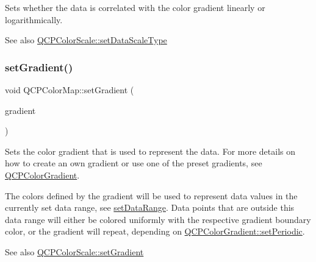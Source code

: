 Sets whether the data is correlated with the color gradient linearly or logarithmically.

\begin{DoxySeeAlso}{See also}
\hyperlink{class_q_c_p_color_scale_aeb6107d67dd7325145b2498abae67fc3}{Q\+C\+P\+Color\+Scale\+::set\+Data\+Scale\+Type} 
\end{DoxySeeAlso}
\mbox{\label{class_q_c_p_color_map_a7313c78360471cead3576341a2c50377}} 
\subsubsection{\texorpdfstring{set\+Gradient()}{setGradient()}}
{\footnotesize\ttfamily void Q\+C\+P\+Color\+Map\+::set\+Gradient (\begin{DoxyParamCaption}\item[{const \hyperlink{class_q_c_p_color_gradient}{Q\+C\+P\+Color\+Gradient} \&}]{gradient }\end{DoxyParamCaption})}

Sets the color gradient that is used to represent the data. For more details on how to create an own gradient or use one of the preset gradients, see \hyperlink{class_q_c_p_color_gradient}{Q\+C\+P\+Color\+Gradient}.

The colors defined by the gradient will be used to represent data values in the currently set data range, see \hyperlink{class_q_c_p_color_map_a980b42837821159786a85b4b7dcb8774}{set\+Data\+Range}. Data points that are outside this data range will either be colored uniformly with the respective gradient boundary color, or the gradient will repeat, depending on \hyperlink{class_q_c_p_color_gradient_a39d6448155fc00a219f239220d14bb39}{Q\+C\+P\+Color\+Gradient\+::set\+Periodic}.

\begin{DoxySeeAlso}{See also}
\hyperlink{class_q_c_p_color_scale_a1f29583bb6f1e7f473b62fb712be3940}{Q\+C\+P\+Color\+Scale\+::set\+Gradient} 
\end{DoxySeeAlso}
\mbox{\label{class_q_c_p_color_map_a484eaa8a5065cfc386b15375bf98b964}} 
